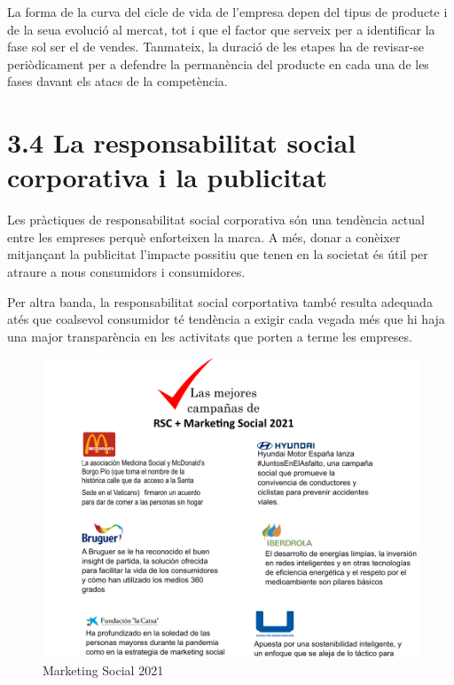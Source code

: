 \documentclass[
]{book}
\begin{document}
La forma de la curva del cicle de vida de l'empresa depen del tipus de producte i de la seua evolució al mercat, tot i que el factor que serveix per a identificar la fase sol ser el de vendes. Tanmateix, la duració de les etapes ha de revisar-se periòdicament per a defendre la permanència del producte en cada una de les fases davant els atacs de la competència.

\hypertarget{la-responsabilitat-social-corporativa-i-la-publicitat}{%
\section*{3.4 La responsabilitat social corporativa i la publicitat}\label{la-responsabilitat-social-corporativa-i-la-publicitat}}

Les pràctiques de responsabilitat social corporativa són una tendència actual entre les empreses perquè enforteixen la marca. A més, donar a conèixer mitjançant la publicitat l'impacte possitiu que tenen en la societat és útil per atraure a nous consumidors i consumidores.

Per altra banda, la responsabilitat social corportativa també resulta adequada atés que coalsevol consumidor té tendència a exigir cada vegada més que hi haja una major transparència en les activitats que porten a terme les empreses.

\begin{figure}
\includegraphics[width=1\linewidth]{marketingSocial} \caption{Marketing Social 2021}\label{fig:unnamed-chunk-5}
\end{figure}

  
\end{document}
